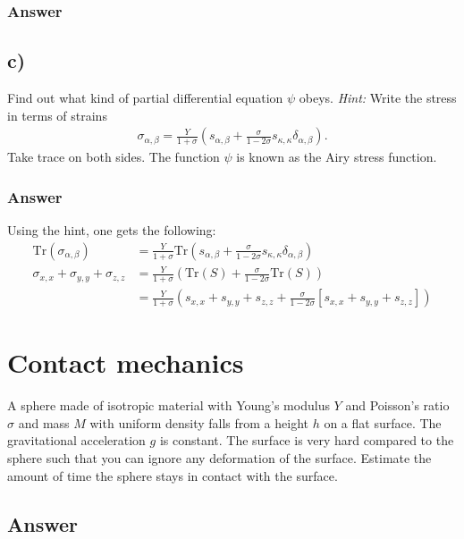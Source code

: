 \documentclass{article}
\newcommand{\trace}{\text{Tr}}
\begin{document}
\subsubsection*{Answer}
\subsection*{c)}
Find out what kind of partial differential equation $\psi$ obeys. \textit{Hint:} Write the stress in terms of strains
\begin{align*}
    \sigma_{\alpha, \beta} = \frac{Y}{1+\sigma}\left(s_{\alpha,\beta} + \frac{\sigma}{1-2\sigma}s_{\kappa, \kappa}\delta_{\alpha,\beta}\right).
\end{align*}Take trace on both sides. The function $\psi$ is known as the Airy stress function.

\subsubsection*{Answer}
Using the hint, one gets the following:
\begin{align*}
    \trace\left(\sigma_{\alpha, \beta}\right) &= \frac{Y}{1+\sigma}\trace\left(s_{\alpha,\beta} + \frac{\sigma}{1-2\sigma}s_{\kappa, \kappa}\delta_{\alpha,\beta}\right)\\
    \sigma_{x,x} + \sigma_{y,y} + \sigma_{z,z} &= \frac{Y}{1+\sigma}\left(\trace(S) + \frac{\sigma}{1-2\sigma}\trace(S)\right)\\
    &=\frac{Y}{1+\sigma}\left(s_{x,x} + s_{y,y} + s_{z,z} + \frac{\sigma}{1-2\sigma}\left[s_{x,x} + s_{y,y} + s_{z,z}\right]\right)
\end{align*}




\section*{Contact mechanics}
A sphere made of isotropic material with Young's modulus $Y$ and Poisson's ratio $\sigma$ and mass $M$ with uniform density falls from a height $h$ on a flat surface.
The gravitational acceleration $g$ is constant. The surface is very hard compared to the sphere such that you can ignore any deformation of the surface. Estimate the amount of time the sphere stays in contact with the surface.

\subsection*{Answer}
\end{document}
